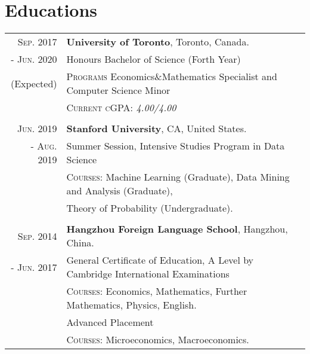 \documentclass[a4paper,10pt]{article}
\begin{document}
\section{Educations}
\begin{tabular}{rl}

    \textsc{Sep.} 2017 & \textbf{University of Toronto}, Toronto, Canada. \\
    - \textsc{Jun.} 2020 & {Honours Bachelor of Science} (Forth Year) \\
    (Expected)& \quad \textsc{Programs} Economics\&Mathematics Specialist and Computer Science Minor \\
    & \quad \textsc{Current cGPA: } \emph{4.00/4.00}
    \\
    \quad
    \\
    
    \textsc{Jun.} 2019 & \textbf{Stanford University}, CA, United States. \\
    - \textsc{Aug.} 2019 & Summer Session, Intensive Studies Program in Data Science\\
    	& \quad \textsc{Courses:} Machine Learning (Graduate), Data Mining and Analysis (Graduate), \\
    	& \quad Theory of Probability (Undergraduate).
    \\
    \quad 
    \\
    \textsc{Sep.} 2014 & \textbf{Hangzhou Foreign Language School}, Hangzhou, China.\\
    - \textsc{Jun.} 2017 & {General Certificate of Education, A Level by Cambridge International Examinations} \\
    & \quad \textsc{Courses}: Economics, Mathematics, Further Mathematics, Physics, English. \\
    & {Advanced Placement} \\
    & \quad \textsc{Courses}: Microeconomics, Macroeconomics.


\end{tabular}
\end{document}
